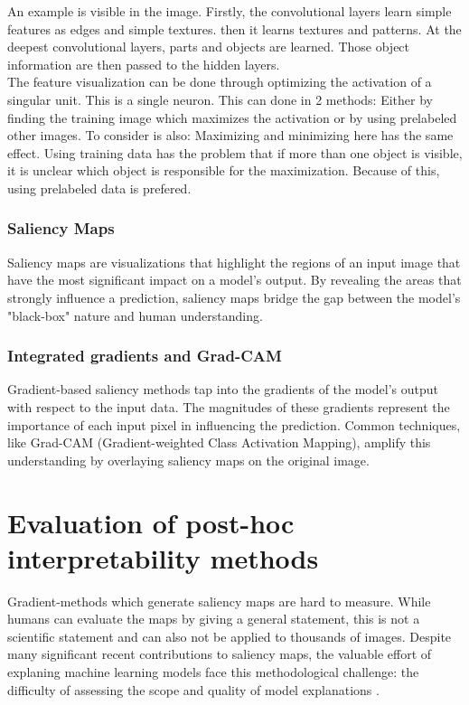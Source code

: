 An example is visible in the image. Firstly, the convolutional layers learn simple features as edges and simple textures. then it learns textures and patterns. At the deepest convolutional layers, parts and objects are learned. Those object information are then passed to the hidden layers.
\\

The feature visualization can be done through optimizing the activation of a singular unit. This is a single neuron. This can done in 2 methods: Either by finding the training image which maximizes the activation or by using prelabeled other images. To consider is also: Maximizing and minimizing here has the same effect.
Using training data has the problem that if more than one object is visible, it is unclear which object is responsible for the maximization. Because of this, using prelabeled data is prefered.


\subsection{Saliency Maps}

Saliency maps are visualizations that highlight the regions of an input image that have the most significant impact on a model's output. By revealing the areas that strongly influence a prediction, saliency maps bridge the gap between the model's "black-box" nature and human understanding.


\subsection{Integrated gradients and Grad-CAM}

Gradient-based saliency methods tap into the gradients of the model's output with respect to the input data. The magnitudes of these gradients represent the importance of each input pixel in influencing the prediction. Common techniques, like Grad-CAM (Gradient-weighted Class Activation Mapping), amplify this understanding by overlaying saliency maps on the original image.

\chapter{Evaluation of post-hoc interpretability methods}

Gradient-methods which generate saliency maps are hard to measure. While humans can evaluate the maps by giving a general statement, this is not a scientific statement and can also not be applied to thousands of images. Despite many significant recent contributions to saliency maps, the valuable effort of explaning machine learning models face this methodological challenge: the difficulty of assessing the scope and quality of model explanations \cite{adebayo2020sanity}.


